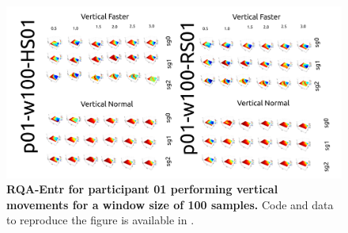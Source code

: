 \documentclass[12pt]{article}
\begin{document}
\begin{figure}[hb!]
\centering
\includegraphics[scale=1.0]{figures/rqa/output/epsilons/rqa-epsilonsp01w100Vertical}
    	\caption{
	{\bf RQA-Entr for participant 01 performing vertical movements for a window size of 100 samples.}
	Code and data to reproduce the figure is available in \cite{srep2020}.
        }
    \label{fig-p01-V-w100}
\end{figure}
\end{document}
